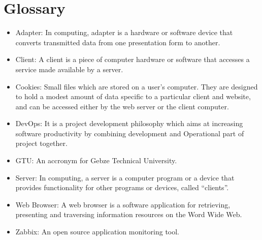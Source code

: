 \documentclass{article}
\begin{document}
\section{Glossary} 
\begin{itemize}
	\item	Adapter: In computing, adapter is a hardware or software device that converts transmitted data from one presentation form to another.
	\item 	Client: A client is a piece of computer hardware or software that accesses a service made available by a server.
 	\item Cookies: Small files which are stored on a user's computer. They are  designed to hold a modest amount of data specific to a particular client and website, and can be accessed either by the web server or the client computer.
	\item DevOps: It is a project development philosophy which aims at increasing software         
            productivity by combining development and Operational part of project  together.
	\item GTU: An accronym for Gebze Technical University.
	\item Server: In computing, a server is a computer program or a device that provides functionality for other programs or devices, called “clients”.

	\item	Web Browser: A web browser is a software application for retrieving, presenting and traversing information resources on the Word Wide Web.
	\item	Zabbix: An open source application monitoring tool.

\end{itemize}


	
	
\end{document}

